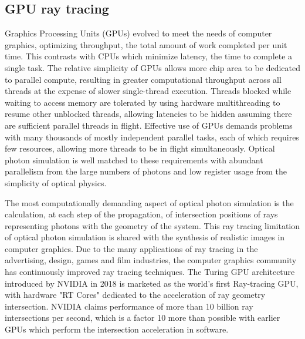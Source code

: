 \documentclass{webofc}
\begin{document}
\subsection{GPU ray tracing}%
%
Graphics Processing Units (GPUs) evolved to meet the needs of computer graphics, 
optimizing throughput\cite{throughput}, the total amount of work completed per unit time. 
This contrasts with CPUs which minimize latency, the time to complete a single task. 
The relative simplicity of GPUs allows more chip area to be dedicated to parallel compute, 
resulting in greater computational throughput across all threads at the expense of 
slower single-thread execution. Threads blocked while waiting to access memory are tolerated by using hardware multithreading to 
resume other unblocked threads, allowing latencies to be hidden assuming there are sufficient parallel threads in flight. 
%
Effective use of GPUs demands problems with many thousands of mostly independent parallel 
tasks, each of which requires few resources, allowing more threads to be in flight 
simultaneously.
%
Optical photon simulation is well matched to these requirements with abundant parallelism 
from the large numbers of photons and low register usage from the simplicity of optical physics.

The most computationally demanding aspect of optical photon simulation 
is the calculation, at each step of the propagation, 
of intersection positions of rays representing photons with the geometry of the system.
This ray tracing limitation of optical photon simulation is shared 
with the synthesis of realistic images in computer graphics. Due to the many applications
of ray tracing in the advertising, design, games and film industries, the computer graphics
community has continuously improved ray tracing techniques. The Turing GPU architecture 
introduced by NVIDIA in 2018 is marketed as the world's first Ray-tracing GPU, with   
hardware "RT Cores" dedicated to the 
acceleration of ray geometry intersection.
NVIDIA claims performance of more than 10 billion ray intersections 
per second, which is a factor 10 more than possible with earlier GPUs
which perform the intersection acceleration in software. 
%
%
\end{document}

